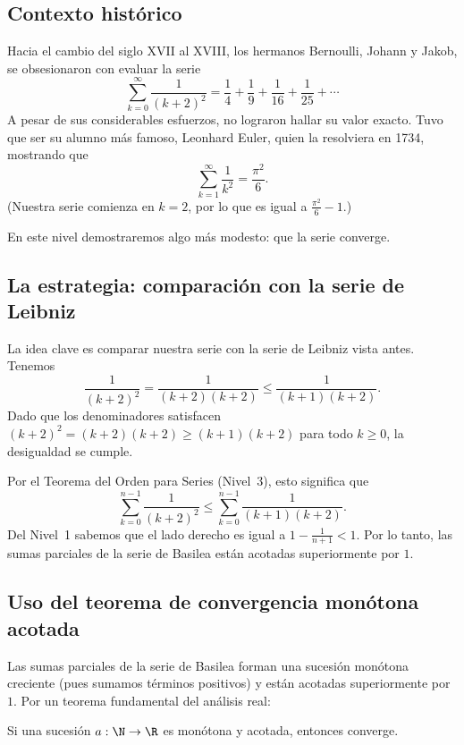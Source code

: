 \subsection{Contexto histórico}

Hacia el cambio del siglo XVII al XVIII, los hermanos Bernoulli, Johann y Jakob, se obsesionaron con evaluar la serie
\[
  \sum_{k=0}^{\infty} \frac{1}{(k+2)^2} = \frac14 + \frac19 + \frac1{16} + \frac1{25} + \cdots
\]
A pesar de sus considerables esfuerzos, no lograron hallar su valor exacto. Tuvo que ser su alumno más famoso, Leonhard Euler, quien la resolviera en 1734, mostrando que
\[
  \sum_{k=1}^{\infty} \frac{1}{k^2} = \frac{\pi^2}{6} .
\]
(Nuestra serie comienza en $k=2$, por lo que es igual a $\frac{\pi^2}{6} - 1$.)

En este nivel demostraremos algo más modesto: que la serie converge.

\subsection{La estrategia: comparación con la serie de Leibniz}

La idea clave es comparar nuestra serie con la serie de Leibniz vista antes. Tenemos
\[
  \frac{1}{(k+2)^2} = \frac{1}{(k+2)(k+2)} \le \frac{1}{(k+1)(k+2)} .
\]
Dado que los denominadores satisfacen $(k+2)^2 = (k+2)(k+2) \ge (k+1)(k+2)$ para todo $k \ge 0$, la desigualdad se cumple.

Por el Teorema del Orden para Series (Nivel~3), esto significa que
\[
  \sum_{k=0}^{n-1} \frac{1}{(k+2)^2} \le \sum_{k=0}^{n-1} \frac{1}{(k+1)(k+2)} .
\]
Del Nivel~1 sabemos que el lado derecho es igual a $1 - \frac{1}{n+1} < 1$. Por lo tanto, las sumas parciales de la serie de Basilea están acotadas superiormente por $1$.

\subsection{Uso del teorema de convergencia monótona acotada}

Las sumas parciales de la serie de Basilea forman una sucesión monótona creciente (pues sumamos términos positivos) y están acotadas superiormente por $1$. Por un teorema fundamental del análisis real:

\begin{teorema}[SeqConvOfMonotoneBdd]
Si una sucesión $a : \N \to \R$ es monótona y acotada, entonces converge.
\end{teorema}

